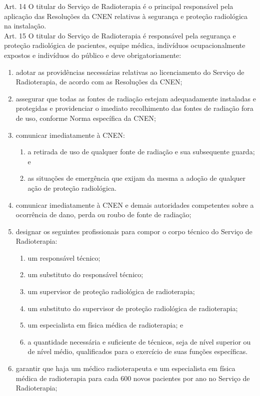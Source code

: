 \noindent Art. 14 O titular do Serviço de Radioterapia é o principal responsável pela aplicação das Resoluções da CNEN relativas à segurança e proteção radiológica na instalação.\\
\noindent Art. 15 O titular do Serviço de Radioterapia é responsável pela segurança e proteção radiológica de pacientes, equipe médica, indivíduos ocupacionalmente expostos e indivíduos do público e deve obrigatoriamente:
\begin{enumerate}[label=\Roman*.]
    \item adotar as providências necessárias relativas ao licenciamento do Serviço de Radioterapia, de acordo com as Resoluções da CNEN;
    \item assegurar que todas as fontes de radiação estejam adequadamente instaladas e protegidas e providenciar o imediato recolhimento das fontes de radiação fora de uso, conforme Norma específica da CNEN;
    \item comunicar imediatamente à CNEN:
    \begin{enumerate}
        \item a retirada de uso de qualquer fonte de radiação e sua subsequente 	guarda; e
        \item as situações de emergência que exijam da mesma a adoção de 	qualquer ação de proteção radiológica.
    \end{enumerate}
        \item comunicar imediatamente à CNEN e demais autoridades competentes sobre a ocorrência de dano, perda ou roubo de fonte de radiação;
        \item designar os seguintes profissionais para compor o corpo técnico do Serviço de Radioterapia:
    \begin{enumerate}
        \item um responsável técnico;
        \item um substituto do responsável técnico;
        \item um supervisor de proteção radiológica de radioterapia;
        \item um substituto do supervisor de proteção radiológica de radioterapia;
        \item um especialista em física médica de radioterapia; e
        \item a quantidade necessária e suficiente de técnicos, seja de nível 	superior ou de nível médio, qualificados para o exercício de suas funções 	específicas.
    \end{enumerate}
    \item garantir que haja um médico radioterapeuta e um especialista em física médica de radioterapia para cada 600 novos pacientes por ano no Serviço de Radioterapia;

\end{enumerate}
